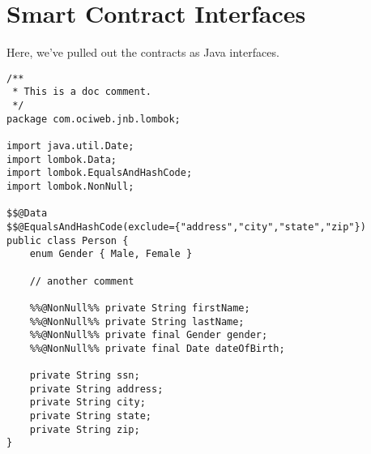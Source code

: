 

\section{Smart Contract Interfaces}
\label{appendix:contract}

Here, we've pulled out the contracts as Java interfaces. 

\begin{lstlisting}
/**
 * This is a doc comment.
 */
package com.ociweb.jnb.lombok;

import java.util.Date;
import lombok.Data;
import lombok.EqualsAndHashCode;
import lombok.NonNull;

$$@Data
$$@EqualsAndHashCode(exclude={"address","city","state","zip"})
public class Person {
    enum Gender { Male, Female }

    // another comment

    %%@NonNull%% private String firstName;
    %%@NonNull%% private String lastName;
    %%@NonNull%% private final Gender gender;
    %%@NonNull%% private final Date dateOfBirth;

    private String ssn;
    private String address;
    private String city;
    private String state;
    private String zip;
}
\end{lstlisting}